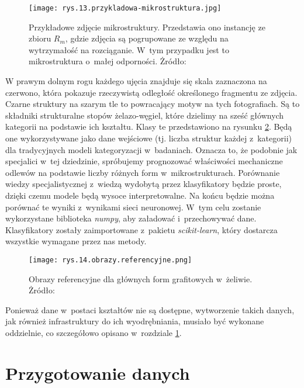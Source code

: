 \begin{figure}[h]
    \centering
    \texttt{[image: rys.13.przykladowa-mikrostruktura.jpg]}
    \caption{Przykładowe zdjęcie mikrostruktury. Przedstawia ono instancję ze zbioru $R_m$, gdzie zdjęcia są pogrupowane ze względu na wytrzymałość na rozciąganie. W~tym przypadku jest to mikrostruktura o~małej odporności. Żródło: \cite{Pirowski17}}
    \label{fig:mesh13}
\end{figure}
W prawym dolnym rogu każdego ujęcia znajduje się skala zaznaczona na czerwono, która pokazuje rzeczywistą odległość określonego fragmentu ze zdjęcia. Czarne struktury na szarym tle to powracający motyw na tych fotografiach. Są to składniki strukturalne stopów żelazo-węgiel, które dzielimy na sześć głównych kategorii na podstawie ich kształtu. Klasy te przedstawiono na rysunku \ref{fig:mesh14}. Będą one wykorzystywane jako dane wejściowe (tj. liczba struktur każdej z~kategorii) dla tradycyjnych modeli kategoryzacji w~badaniach. Oznacza to, że podobnie jak specjalici w~tej dziedzinie, spróbujemy prognozować właściwości mechaniczne odlewów na podstawie liczby różnych form w~mikrostrukturach. Porównanie wiedzy specjalistycznej z~wiedzą wydobytą przez klasyfikatory będzie proste, dzięki czemu modele będą wysoce interpretowalne. Na końcu będzie można porównać te wyniki z~wynikami sieci neuronowej. W~tym celu zostanie wykorzystane biblioteka \textit{numpy}, aby załadować i~przechowywać dane. Klasyfikatory zostały zaimportowane z~pakietu \textit{scikit-learn}, który dostarcza wszystkie wymagane przez nas metody. 
\begin{figure}[h]
    \centering
    \texttt{[image: rys.14.obrazy.referencyjne.png]}
    \caption{Obrazy referencyjne dla głównych form grafitowych w~żeliwie. Żródło: \cite{norma}}
    \label{fig:mesh14}
\end{figure}
Ponieważ dane w~postaci kształtów nie są dostępne, wytworzenie takich danych, jak również infrastruktury do ich wyodrębniania, musiało być wykonane oddzielnie, co szczegółowo opisano w~rozdziale \ref{sec:przygotowanie_danych}.

\section{Przygotowanie danych}
\label{sec:przygotowanie_danych}

